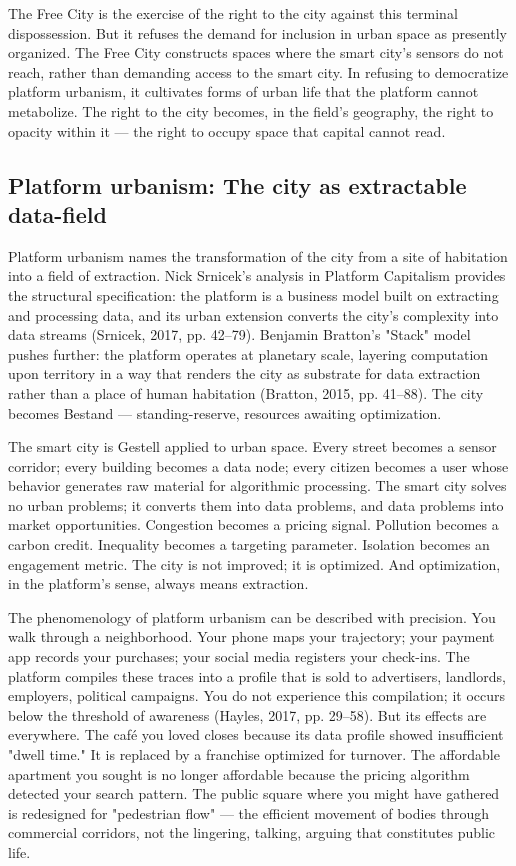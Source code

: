 The Free City is the exercise of the right to the city against this terminal dispossession. But it refuses the demand for inclusion in urban space as presently organized. The Free City constructs spaces where the smart city's sensors do not reach, rather than demanding access to the smart city. In refusing to democratize platform urbanism, it cultivates forms of urban life that the platform cannot metabolize. The right to the city becomes, in the field's geography, the right to opacity within it — the right to occupy space that capital cannot read.

\subsection{Platform urbanism: The city as extractable data-field}

Platform urbanism names the transformation of the city from a site of habitation into a field of extraction. Nick Srnicek's analysis in Platform Capitalism provides the structural specification: the platform is a business model built on extracting and processing data, and its urban extension converts the city's complexity into data streams (Srnicek, 2017, pp. 42–79). Benjamin Bratton's "Stack" model pushes further: the platform operates at planetary scale, layering computation upon territory in a way that renders the city as substrate for data extraction rather than a place of human habitation (Bratton, 2015, pp. 41–88). The city becomes Bestand — standing-reserve, resources awaiting optimization.

The smart city is Gestell applied to urban space. Every street becomes a sensor corridor; every building becomes a data node; every citizen becomes a user whose behavior generates raw material for algorithmic processing. The smart city solves no urban problems; it converts them into data problems, and data problems into market opportunities. Congestion becomes a pricing signal. Pollution becomes a carbon credit. Inequality becomes a targeting parameter. Isolation becomes an engagement metric. The city is not improved; it is optimized. And optimization, in the platform's sense, always means extraction.

The phenomenology of platform urbanism can be described with precision. You walk through a neighborhood. Your phone maps your trajectory; your payment app records your purchases; your social media registers your check-ins. The platform compiles these traces into a profile that is sold to advertisers, landlords, employers, political campaigns. You do not experience this compilation; it occurs below the threshold of awareness (Hayles, 2017, pp. 29–58). But its effects are everywhere. The café you loved closes because its data profile showed insufficient "dwell time." It is replaced by a franchise optimized for turnover. The affordable apartment you sought is no longer affordable because the pricing algorithm detected your search pattern. The public square where you might have gathered is redesigned for "pedestrian flow" — the efficient movement of bodies through commercial corridors, not the lingering, talking, arguing that constitutes public life.

